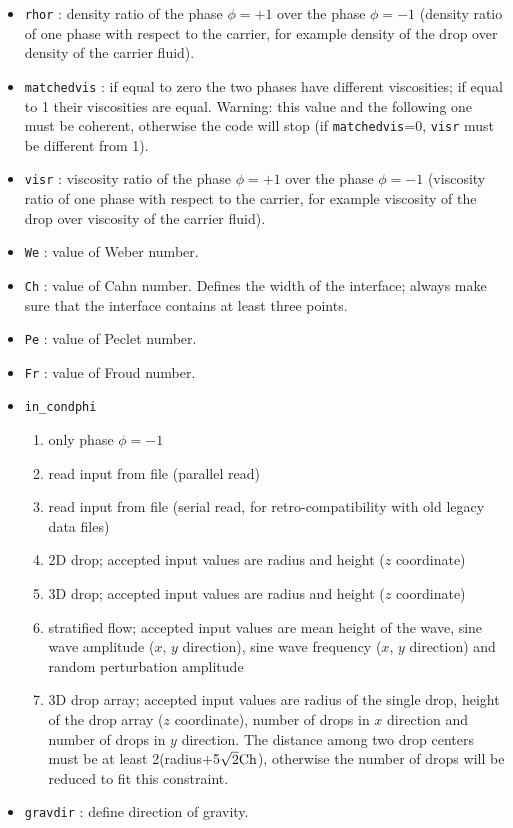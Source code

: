 \begin{itemize}
\item \texttt{rhor} : density ratio of the phase $\phi=+1$ over the phase $\phi=-1$ (density ratio of one phase with respect to the carrier, for example density of the drop over density of the carrier fluid).
\item \texttt{matchedvis} : if equal to zero the two phases have different viscosities; if equal to 1 their viscosities are equal. Warning: this value and the following one must be coherent, otherwise the code will stop (if \texttt{matchedvis}=0, \texttt{visr} must be different from 1).
\item \texttt{visr} : viscosity ratio of the phase $\phi=+1$ over the phase $\phi=-1$ (viscosity ratio of one phase with respect to the carrier, for example viscosity of the drop over viscosity of the carrier fluid).
\item \texttt{We} : value of Weber number.
\item \texttt{Ch} : value of Cahn number. Defines the width of the interface; always make sure that the interface contains at least three points.
\item \texttt{Pe} : value of Peclet number.
\item \texttt{Fr} : value of Froud number.
\item \texttt{in\_condphi}
\begin{enumerate}
\item only phase $\phi=-1$
\item read input from file (parallel read)
\item read input from file (serial read, for retro-compatibility with old legacy data files)
\item 2D drop; accepted input values are radius and height ($z$ coordinate)
\item 3D drop; accepted input values are radius and height ($z$ coordinate)
\item stratified flow; accepted input values are mean height of the wave, sine wave amplitude ($x$, $y$ direction), sine wave frequency ($x$, $y$ direction) and random perturbation amplitude
\item 3D drop array; accepted input values are radius of the single drop, height of the drop array ($z$ coordinate), number of drops in $x$ direction and number of drops in $y$ direction. The distance among two drop centers must be at least 2(radius+5$\sqrt{2}\textnormal{Ch}$), otherwise the number of drops will be reduced to fit this constraint.
\end{enumerate}
\item \texttt{gravdir} : define direction of gravity.

\end{itemize}
